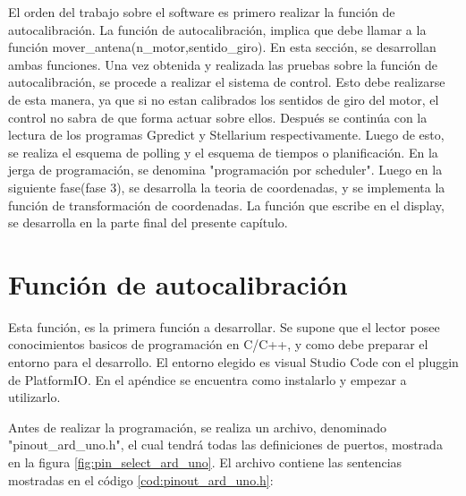 El orden del trabajo sobre el software es primero realizar la función de autocalibración. La función de autocalibración, implica que debe llamar a la función mover\_antena(n\_motor,sentido\_giro). En esta sección, se desarrollan ambas funciones. Una vez obtenida y realizada las pruebas sobre la función de autocalibración, se procede a realizar el sistema de control. Esto debe realizarse de esta manera, ya que si no estan calibrados los sentidos de giro del motor, el control no sabra de que forma actuar sobre ellos. Después se continúa con la lectura de los programas Gpredict y Stellarium respectivamente. Luego de esto, se realiza el esquema de polling y el esquema de tiempos o planificación. En la jerga de programación, se denomina "programación por scheduler". Luego en la siguiente fase(fase 3), se desarrolla la teoria de coordenadas, y se implementa la función de transformación de coordenadas. La función que escribe en el display, se desarrolla en la parte final del presente capítulo. 







%
\section{Función de autocalibración}
Esta función, es la primera función a desarrollar. Se supone que el lector posee conocimientos basicos de programación en C/C++, y como debe preparar el entorno para el desarrollo. El entorno elegido es visual Studio Code con el pluggin de PlatformIO. En el apéndice se encuentra como instalarlo y empezar a utilizarlo. 

Antes de realizar la programación, se realiza un archivo, denominado "pinout\_ard\_uno.h", el cual tendrá todas las definiciones de puertos, mostrada en la figura \ref{fig:pin_select_ard_uno}. El archivo contiene las sentencias mostradas en el código \ref{cod:pinout_ard_uno.h}: 


